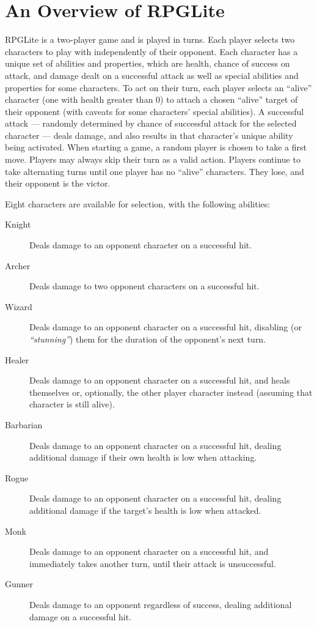 \section{An Overview of RPGLite}
\label{sec:rpglite_overview}


RPGLite is a two-player game and is played in turns. Each player selects two
characters to play with independently of their opponent. Each character has a
unique set of abilities and properties, which are health, chance of success on
attack, and damage dealt on a successful attack as well as special abilities and
properties for some characters. To act on their turn, each player selects an
``alive'' character (one with health greater than 0) to attach a chosen
``alive'' target of their opponent (with caveats for some characters' special
abilities). A successful attack --- randomly determined by chance of successful
attack for the selected character --- deals damage, and also results in that
character's unique ability being activated. When starting a game, a random player is chosen to take a
first move. Players may always skip their turn as a valid action. Players
continue to take alternating turns until one player has no ``alive'' characters.
They lose, and their opponent is the victor.

Eight characters are available for selection, with the following
abilities:  

\begin{description}
\item[Knight] Deals damage to an opponent character on a successful hit.
\item[Archer] Deals damage to two opponent characters on a successful hit.
\item[Wizard] Deals damage to an opponent character on a successful hit,
disabling (or \emph{``stunning''}) them for the duration of the opponent's next
turn.
\item[Healer] Deals damage to an opponent character on a successful hit, and
heals themselves or, optionally, the other player character instead (assuming
that character is still alive).
\item[Barbarian] Deals damage to an opponent character on a successful hit,
dealing additional damage if their own health is low when attacking.
\item[Rogue] Deals damage to an opponent character on a successful hit, dealing
additional damage if the target's health is low when attacked.
\item[Monk] Deals damage to an opponent character on a successful hit, and
immediately takes another turn, until their attack is unsuccessful.
\item[Gunner] Deals damage to an opponent regardless of success, dealing
additional damage on a successful hit.
\end{description}

